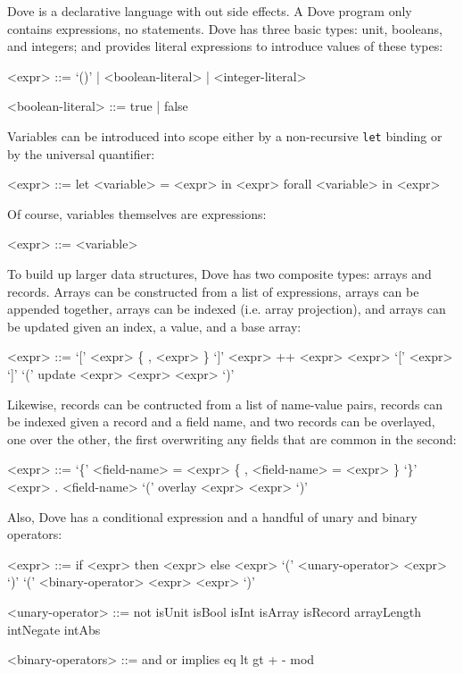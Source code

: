 \documentclass{article}
\begin{document}
Dove is a declarative language with out side effects.  A Dove
program only contains expressions, no statements.
Dove has three basic types: unit, booleans, and integers;
and provides literal expressions to introduce values
of these types:
\setlength{\grammarindent}{10em}
\begin{grammar}
  <expr> ::= `()' | <boolean-literal> | <integer-literal>

  <boolean-literal> ::= true | false
\end{grammar}

Variables can be introduced into scope either by a non-recursive \texttt{let}
binding or by the universal quantifier:

\begin{grammar}
  <expr> ::= let <variable> = <expr> in <expr>
    \alt forall <variable> in <expr>
\end{grammar}

Of course, variables themselves are expressions:

\begin{grammar}
  <expr> ::= <variable>
\end{grammar}

To build up larger data structures, Dove has two composite types: arrays and records.
Arrays can be constructed from a list of expressions, arrays can be appended
together, arrays can be indexed (i.e. array projection), and arrays can be 
updated given an index, a value, and a base array:

\begin{grammar}
  <expr> ::= `[' <expr> \{ , <expr> \} `]'
    \alt <expr> ++ <expr>
    \alt <expr> `[' <expr> `]'
    \alt `(' update <expr> <expr> <expr> `)'
\end{grammar}

Likewise, records can be contructed from a list of name-value pairs,
records can be indexed given a record and a field name, and two
records can be overlayed, one over the other, the first overwriting
any fields that are common in the second:

\begin{grammar}
  <expr> ::= `\{' <field-name> = <expr> \{ , <field-name> = <expr> \} `\}'
    \alt <expr> . <field-name>
    \alt `(' overlay <expr> <expr> `)'
\end{grammar}

Also, Dove has a conditional expression and a handful of unary and binary operators:

\begin{grammar}
  <expr> ::= if <expr> then <expr> else <expr>
    \alt `(' <unary-operator> <expr> `)'
    \alt `(' <binary-operator> <expr> <expr> `)'

  <unary-operator> ::= not
    \alt isUnit
    \alt isBool
    \alt isInt
    \alt isArray
    \alt isRecord
    \alt arrayLength
    \alt intNegate 
    \alt intAbs

  <binary-operators> ::= and
    \alt or
    \alt implies
    \alt eq
    \alt lt
    \alt gt
    \alt +
    \alt -
    \alt *
    \alt mod
\end{grammar}
\end{document}
